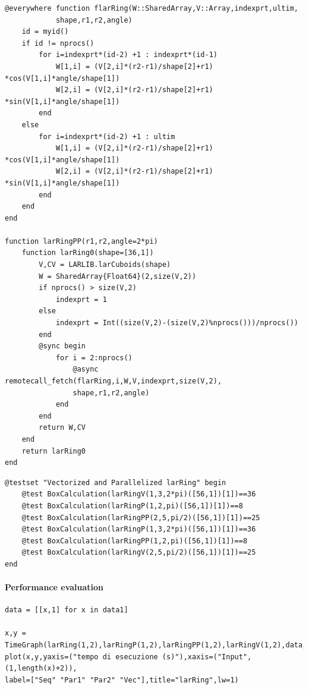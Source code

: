 \documentclass{article}
\begin{document}
\begin{Verbatim}
@everywhere function flarRing(W::SharedArray,V::Array,indexprt,ultim,
            shape,r1,r2,angle)
    id = myid()
    if id != nprocs()
        for i=indexprt*(id-2) +1 : indexprt*(id-1)
            W[1,i] = (V[2,i]*(r2-r1)/shape[2]+r1) *cos(V[1,i]*angle/shape[1])
            W[2,i] = (V[2,i]*(r2-r1)/shape[2]+r1) *sin(V[1,i]*angle/shape[1]) 
        end
    else
        for i=indexprt*(id-2) +1 : ultim
            W[1,i] = (V[2,i]*(r2-r1)/shape[2]+r1) *cos(V[1,i]*angle/shape[1])
            W[2,i] = (V[2,i]*(r2-r1)/shape[2]+r1) *sin(V[1,i]*angle/shape[1])
        end
    end
end

function larRingPP(r1,r2,angle=2*pi)
    function larRing0(shape=[36,1])
        V,CV = LARLIB.larCuboids(shape)
        W = SharedArray{Float64}(2,size(V,2))
        if nprocs() > size(V,2)
            indexprt = 1
        else
            indexprt = Int((size(V,2)-(size(V,2)%nprocs()))/nprocs())
        end
        @sync begin
            for i = 2:nprocs()
                @async remotecall_fetch(flarRing,i,W,V,indexprt,size(V,2),
                shape,r1,r2,angle)
            end
        end
        return W,CV
    end
    return larRing0
end
\end{Verbatim}

\begin{Verbatim}
@testset "Vectorized and Parallelized larRing" begin
    @test BoxCalculation(larRingV(1,3,2*pi)([56,1])[1])==36
    @test BoxCalculation(larRingP(1,2,pi)([56,1])[1])==8
    @test BoxCalculation(larRingPP(2,5,pi/2)([56,1])[1])==25
    @test BoxCalculation(larRingP(1,3,2*pi)([56,1])[1])==36
    @test BoxCalculation(larRingPP(1,2,pi)([56,1])[1])==8
    @test BoxCalculation(larRingV(2,5,pi/2)([56,1])[1])==25
end
\end{Verbatim}

\paragraph{Performance evaluation}

\begin{Verbatim}
data = [[x,1] for x in data1]

x,y = TimeGraph(larRing(1,2),larRingP(1,2),larRingPP(1,2),larRingV(1,2),data,5)
plot(x,y,yaxis=("tempo di esecuzione (s)"),xaxis=("Input",(1,length(x)+2)),
label=["Seq" "Par1" "Par2" "Vec"],title="larRing",lw=1)

\end{Verbatim}
\end{document}
